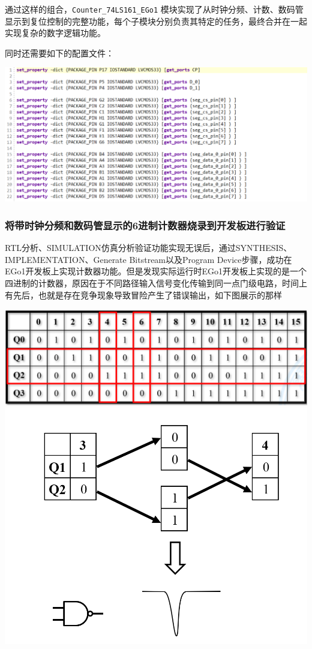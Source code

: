\documentclass[a4,10pt,zihao=-4]{ctexart}
\begin{document}
通过这样的组合，\texttt{Counter\_74LS161\_EGo1} 模块实现了从时钟分频、计数、数码管显示到复位控制的完整功能，每个子模块分别负责其特定的任务，最终合并在一起实现复杂的数字逻辑功能。

同时还需要如下的配置文件：

\vspace{1em}
\noindent\includegraphics[width=1\textwidth]{assets/contin_code.png}

\subsubsection{将带时钟分频和数码管显示的6进制计数器烧录到开发板进行验证}

RTL分析、SIMULATION仿真分析验证功能实现无误后，通过SYNTHESIS、IMPLEMENTATION、Generate Bitstream以及Program Device步骤，成功在EGo1开发板上实现计数器功能。但是发现实际运行时EGo1开发板上实现的是一个四进制的计数器，原因在于不同路径输入信号变化传输到同一点门级电路，时间上有先后，也就是存在竞争现象导致冒险产生了错误输出，如下图展示的那样

\vspace{1em}
\noindent\includegraphics[width=1\textwidth]{assets/table1.png}
\noindent\includegraphics[width=1\textwidth]{assets/table2.png}
\end{document}
